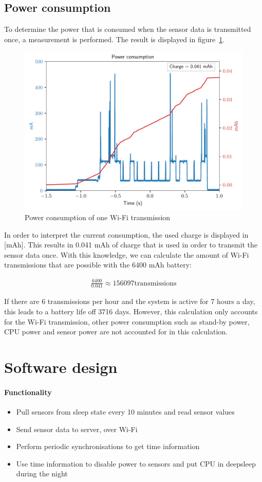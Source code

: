 \documentclass[11pt,a4paper]{article}
\begin{document}
\subsection{Power consumption}
To determine the power that is consumed when the sensor data is transmitted once, a measurement is performed. The result is displayed in figure~\ref{fig:wifi_pwr}.
\begin{figure}[H]
	\centering
	\includegraphics[width=1.0\linewidth]{wifi_pwr.pdf}
	\caption{Power consumption of one Wi-Fi transmission}
	\label{fig:wifi_pwr}
\end{figure}
In order to interpret the current consumption, the used charge is displayed in [mAh]. This results in 0.041 mAh of charge that is used in order to transmit the sensor data once. With this knowledge, we can calculate the amount of Wi-Fi transmissions that are possible with the 6400 mAh battery:

\begin{gather*}
	\frac{6400}{0.041} \approx 156097 \text{transmissions}
\end{gather*}

If there are 6 transmissions per hour and the system is active for 7 hours a day, this leads to a battery life off 3716 days.  However, this calculation only accounts for the Wi-Fi transmission, other power consumption such as stand-by power, CPU power and sensor power are not accounted for in this calculation. 

\section{Software design}
\paragraph{Functionality}
\begin{itemize}
	\item Pull sensors from sleep state every 10 minutes and read sensor values
	\item Send sensor data to server, over Wi-Fi
	\item Perform periodic synchronisations to get time information
	\item Use time information to disable power to sensors and put CPU in deepsleep during the night
\end{itemize}
\end{document}
